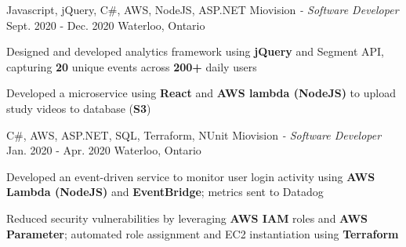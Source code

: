 \begin{siderules}
  \begin{cventries}
    \cventry
    {Javascript, jQuery, C\#, AWS, NodeJS, ASP.NET}
    {Miovision\hspace{0.15em} \bodyfontlight\itshape{- Software Developer}}
    {Sept. 2020 - Dec. 2020}
    {Waterloo, Ontario}
    {
      \begin{cvitems}
        \item {Designed and developed analytics framework using \textbf{jQuery} and Segment API, capturing \textbf{20} unique events across \textbf{200+} daily users}
        \item {Developed a microservice using \textbf{React} and \textbf{AWS lambda (NodeJS)} to upload study videos to database (\textbf{S3})}
      \end{cvitems}
    }
    \cventry
    {C\#, AWS, ASP.NET, SQL, Terraform, NUnit}
    {Miovision\hspace{0.15em} \bodyfontlight\itshape{- Software Developer}}
    {Jan. 2020 - Apr. 2020}
    {Waterloo, Ontario}
    {
      \begin{cvitems}
        \item {Developed an event-driven service to monitor user login activity using \textbf{AWS Lambda (NodeJS)} and \textbf{EventBridge}; metrics sent to Datadog}
        \item {Reduced security vulnerabilities by leveraging \textbf{AWS IAM} roles and \textbf{AWS Parameter}; automated role assignment and EC2 instantiation using \textbf{Terraform}}

\end{cvitems}}
\end{cventries}
\end{siderules}
